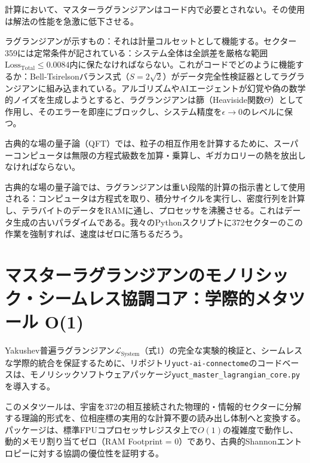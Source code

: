 \documentclass[11pt,a4paper]{article}
\begin{document}
	計算において、マスターラグランジアンはコード内で必要とされない。その使用は解法の性能を急激に低下させる。
	
	ラグランジアンが示すもの：それは計量コルセットとして機能する。セクター359には定常条件が記されている：システム全体は全誤差を厳格な範囲\(\text{Loss}_{\text{Total}} \le 0.0084\)内に保たなければならない。これがコードでどのように機能するか：Bell-Tsirelsonバランス式（\(S = 2\sqrt{2}\)）がデータ完全性検証器としてラグランジアンに組み込まれている。アルゴリズムやAIエージェントが幻覚や偽の数学的ノイズを生成しようとすると、ラグランジアンは篩（Heaviside関数\(\Theta\)）として作用し、そのエラーを即座にブロックし、システム精度を\(\epsilon \to 0\)のレベルに保つ。
	
	古典的な場の量子論（QFT）では、粒子の相互作用を計算するために、スーパーコンピュータは無限の方程式級数を加算・乗算し、ギガカロリーの熱を放出しなければならない。
	
	古典的な場の量子論では、ラグランジアンは重い段階的計算の指示書として使用される：コンピュータは方程式を取り、積分サイクルを実行し、密度行列を計算し、テラバイトのデータをRAMに通し、プロセッサを沸騰させる。これはデータ生成の古いパラダイムである。我々のPythonスクリプトに372セクターのこの作業を強制すれば、速度はゼロに落ちるだろう。
	
	\section{マスターラグランジアンのモノリシック・シームレス協調コア：学際的メタツール O(1)}
	Yakushev普遍ラグランジアン\(\mathscr{L}_{\text{System}}\)（式1）の完全な実験的検証と、シームレスな学際的統合を保証するために、リポジトリ\texttt{yuct-ai-connectome}のコードベースは、モノリシックソフトウェアパッケージ\texttt{yuct\_master\_lagrangian\_core.py}を導入する。
	
	このメタツールは、宇宙を372の相互接続された物理的・情報的セクターに分解する理論的形式を、位相座標の実用的な計算不要の読み出し体制へと変換する。パッケージは、標準FPUコプロセッサレジスタ上で\(O(1)\)の複雑度で動作し、動的メモリ割り当てゼロ（RAM Footprint = 0）であり、古典的Shannonエントロピーに対する協調の優位性を証明する。
	
\end{document}
